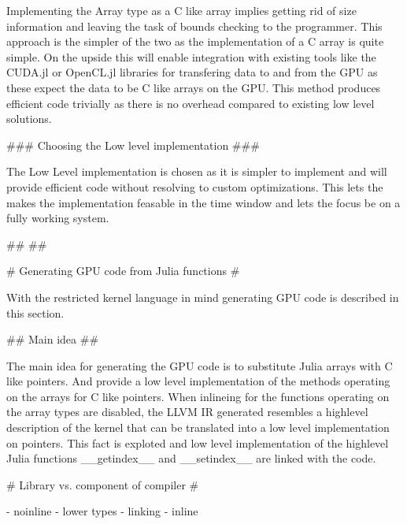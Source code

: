 \begin{markdown}
Implementing the Array type as a C like array implies getting rid of
size information and leaving the task of bounds checking to the
programmer. This approach is the simpler of the two as the
implementation of a C array is quite simple. On the upside this will
enable integration with existing tools like the CUDA.jl or OpenCL.jl
libraries for transfering data to and from the GPU as these expect the
data to be C like arrays on the GPU. This method produces efficient
code trivially as there is no overhead compared to existing low level
solutions. 

### Choosing the Low level implementation ###

The Low Level implementation is chosen as it is simpler to implement
and will provide efficient code without resolving to custom
optimizations. This lets the makes the implementation feasable in the
time window and lets the focus be on a fully working system. 

## ##

# Generating GPU code from Julia functions #

With the restricted kernel language in mind generating GPU code
is described in this section.

## Main idea ##

The main idea for generating the GPU code is to substitute Julia
arrays with C like pointers. And provide a low level implementation of
the methods operating on the arrays for C like pointers. When
inlineing for the functions operating on the array types are disabled,
the LLVM IR generated resembles a highlevel description of the kernel
that can be translated into a low level implementation on pointers. This
fact is exploted and low level implementation of the highlevel Julia
functions __getindex__ and __setindex__ are linked with the code.

# Library vs. component of compiler #



 
  - noinline
  - lower types
  - linking
  - inline
  
\end{markdown}
